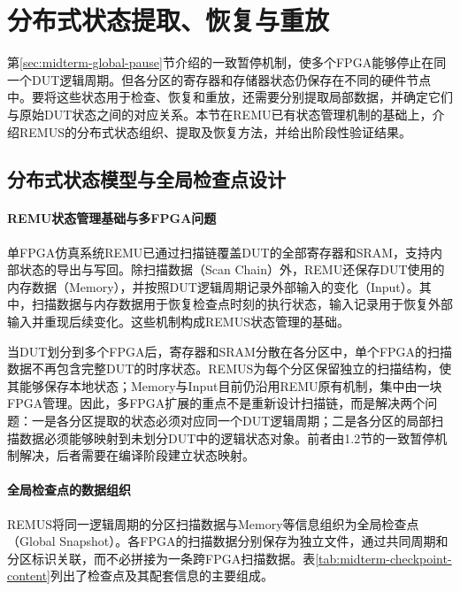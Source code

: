 \section{分布式状态提取、恢复与重放}
\label{sec:midterm-state-replay}

第\ref{sec:midterm-global-pause}节介绍的一致暂停机制，使多个FPGA能够停止在同一个DUT逻辑周期。但各分区的寄存器和存储器状态仍保存在不同的硬件节点中。要将这些状态用于检查、恢复和重放，还需要分别提取局部数据，并确定它们与原始DUT状态之间的对应关系。本节在REMU已有状态管理机制的基础上，介绍REMUS的分布式状态组织、提取及恢复方法，并给出阶段性验证结果。

\subsection{分布式状态模型与全局检查点设计}
\label{sec:midterm-global-snapshot}

\paragraph{REMU状态管理基础与多FPGA问题}

单FPGA仿真系统REMU已通过扫描链覆盖DUT的全部寄存器和SRAM，支持内部状态的导出与写回\cite{chen_remu_2023}。除扫描数据（Scan Chain）外，REMU还保存DUT使用的内存数据（Memory），并按照DUT逻辑周期记录外部输入的变化（Input）。其中，扫描数据与内存数据用于恢复检查点时刻的执行状态，输入记录用于恢复外部输入并重现后续变化。这些机制构成REMUS状态管理的基础。

当DUT划分到多个FPGA后，寄存器和SRAM分散在各分区中，单个FPGA的扫描数据不再包含完整DUT的时序状态。REMUS为每个分区保留独立的扫描结构，使其能够保存本地状态；Memory与Input目前仍沿用REMU原有机制，集中由一块FPGA管理。因此，多FPGA扩展的重点不是重新设计扫描链，而是解决两个问题：一是各分区提取的状态必须对应同一个DUT逻辑周期；二是各分区的局部扫描数据必须能够映射到未划分DUT中的逻辑状态对象。前者由1.2节的一致暂停机制解决，后者需要在编译阶段建立状态映射。

\paragraph{全局检查点的数据组织}

REMUS将同一逻辑周期的分区扫描数据与Memory等信息组织为全局检查点（Global Snapshot）。各FPGA的扫描数据分别保存为独立文件，通过共同周期和分区标识关联，而不必拼接为一条跨FPGA扫描数据。表\ref{tab:midterm-checkpoint-content}列出了检查点及其配套信息的主要组成。

